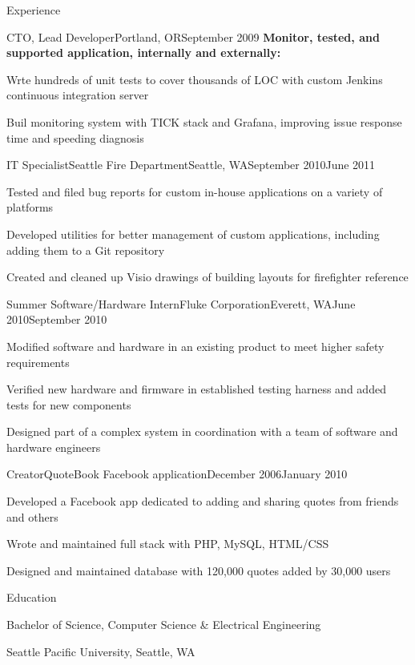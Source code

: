 \documentclass[letterpaper,10pt]{article}
\let\pt\pasttense
\let\anon\anonno
\begin{document}
\begin{res_section}{Experience}
\begin{res_experienceitem}{CTO, Lead Developer}{\anon{SERPs.com}{SaaSCo}}{Portland, OR}{September 2009}{{\pt[Present]{Present}}}
  \nonitem \textbf{Monitor\pt{ed}, tested, and supported application, internally and externally:}
  \item Wr\pt[i]{o}te hundreds of unit tests to cover thousands of LOC with custom Jenkins continuous integration server
  \item Buil\pt[d]{t} monitoring system with TICK stack and Grafana, improving issue response time and speeding diagnosis
\end{res_experienceitem}
\begin{res_experienceitem}{IT Specialist}{Seattle Fire Department}{Seattle, WA}{September 2010}{June 2011}
  \item Tested and filed bug reports for custom in-house applications on a variety of platforms
  \item Developed utilities for better management of custom applications, including adding them to a Git repository
  \item Created and cleaned up Visio drawings of building layouts for firefighter reference
\end{res_experienceitem}
\begin{res_experienceitem}{Summer Software/Hardware Intern}{Fluke Corporation}{Everett, WA}{June 2010}{September 2010}
  \item Modified software and hardware in an existing product to meet higher safety requirements
  \item Verified new hardware and firmware in established testing harness and added tests for new components
  \item Designed part of a complex system in coordination with a team of software and hardware engineers
\end{res_experienceitem}
\begin{res_experienceitem}{Creator}{QuoteBook Facebook application}{}{December 2006}{January 2010}
  \item Developed a Facebook app dedicated to adding and sharing quotes from friends and others
  \item Wrote and maintained full stack with PHP, MySQL, HTML/CSS
  \item Designed and maintained database with 120,000 quotes added by 30,000 users
\end{res_experienceitem}
\end{res_section}

\begin{res_section}{Education}
\begin{res_subsection}{Bachelor of Science, Computer Science \& Electrical Engineering}
    \item Seattle Pacific University, Seattle, WA
\end{res_subsection}
\end{res_section}
\end{document}

